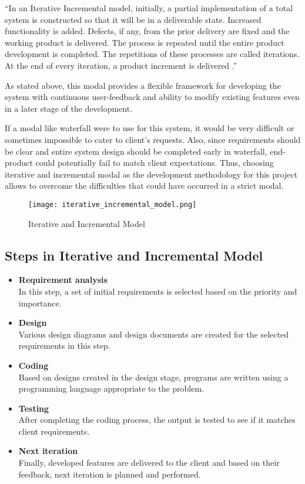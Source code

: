 \documentclass[12pt]{report}
\begin{document}
``In an Iterative Incremental model, initially, a partial implementation of a total system is constructed so that it will be in a deliverable state. Increased functionality is added. Defects, if any, from the prior delivery are fixed and the working product is delivered. The process is repeated until the entire product development is completed. The repetitions of these processes are called iterations. At the end of every iteration, a product increment is delivered \cite{point_2019_sdlc}.''

As stated above, this modal provides a flexible framework for developing the system with continuous user-feedback and ability to modify existing features even in a later stage of the development.

If a modal like waterfall were to use for this system, it would be very difficult or sometimes impossible to cater to client's requests. Also, since requirements should be clear and entire system design should be completed early in waterfall, end-product could potentially fail to match client expectations. Thus, choosing iterative and incremental modal as the development methodology for this project allows to overcome the difficulties that could have occurred in a strict modal.

\begin{figure}[H]
	\centering
	\texttt{[image: iterative\_incremental\_model.png]}
	\caption{Iterative and Incremental Model}
\end{figure}

\subsection{Steps in Iterative and Incremental Model}
\begin{itemize}
	\item {\bf{Requirement analysis}}\\
	      In this step, a set of initial requirements is selected based on the priority and importance.

	\item {\bf{Design}}\\
	      Various design diagrams and design documents are created for the selected requirements in this step.

	\item {\bf{Coding}}\\
	      Based on designs created in the design stage, programs are written using a programming language appropriate to the problem.

	\item {\bf{Testing}}\\
	      After completing the coding process, the output is tested to see if it matches client requirements.

	\item {\bf{Next iteration}}\\
	      Finally, developed features are delivered to the client and based on their feedback, next iteration is planned and performed.

\end{itemize}
\end{document}
